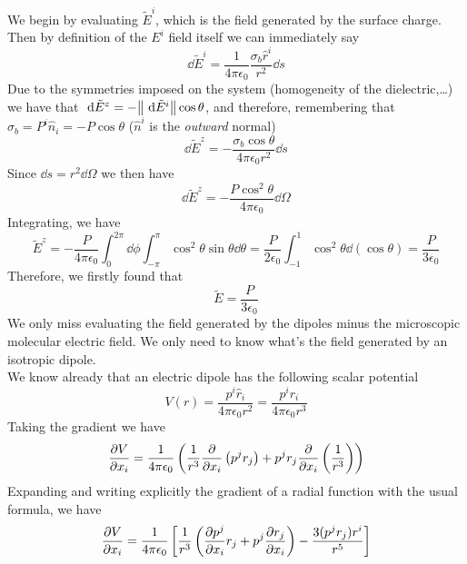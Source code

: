 \documentclass[../electromagnetism]{subfiles}
\begin{document}
We begin by evaluating $\tilde{E}^i$, which is the field generated by the surface charge. Then by definition of the $E^i$ field itself we can immediately say
\begin{equation*}
	\dd\tilde{E}^i=\frac{1}{4\pi\epsilon_0}\frac{\sigma_b\hat{r}^i}{r^2}\dd s
\end{equation*}
Due to the symmetries imposed on the system (homogeneity of the dielectric,\ldots) we have that $\ \mathrm{d}\tilde{E}^z=-\norm{\ \mathrm{d}\tilde{E}^i}\cos\theta$, and therefore, remembering that $\sigma_b=P^i\hat{n}_i=-P\cos\theta$ ($\hat{n}^i$ is the \emph{outward} normal)
\begin{equation*}
	\dd\tilde{E}^z=-\frac{\sigma_b\cos\theta}{4\pi\epsilon_0r^2}\dd s
\end{equation*}
Since $\dd s=r^2\dd\Omega$ we then have
\begin{equation}
	\dd\tilde{E}^z=-\frac{P\cos^2\theta}{4\pi\epsilon_0}\dd\Omega
	\label{eq:tildeez}
\end{equation}
Integrating, we have
\begin{equation}
	\tilde{E}^z=-\frac{P}{4\pi\epsilon_0}\int_{0}^{2\pi}\dd\phi\int_{-\pi}^{\pi}\cos^2\theta\sin\theta\dd\theta=\frac{P}{2\epsilon_0}\int_{-1}^1\cos^2\theta\dd\left( \cos\theta \right)=\frac{P}{3\epsilon_0}
	\label{eq:tildeezintdie}
\end{equation}
Therefore, we firstly found that
\begin{equation}
	\tilde{E}=\frac{P}{3\epsilon_0}
	\label{eq:pover3epsilonnottildee}
\end{equation}
We only miss evaluating the field generated by the dipoles minus the microscopic molecular electric field. We only need to know what's the field generated by an isotropic dipole.\\
We know already that an electric dipole has the following scalar potential
\begin{equation*}
	V(r)=\frac{p^i\hat{r}_i}{4\pi\epsilon_0r^2}=\frac{p^ir_i}{4\pi\epsilon_0r^3}
\end{equation*}
Taking the gradient we have
\begin{equation*}
	\pdv{V}{x_i}=\frac{1}{4\pi\epsilon_0}\left( \frac{1}{r^3}\pdv{x_i}\left( p^jr_j \right)+p^jr_j\pdv{x_i}\left( \frac{1}{r^3} \right) \right)
\end{equation*}
Expanding and writing explicitly the gradient of a radial function with the usual formula, we have
\begin{equation*}
	\pdv{V}{x_i}=\frac{1}{4\pi\epsilon_0}\left[ \frac{1}{r^3}\left( \pdv{p^j}{x_i}r_j+p^j\pdv{r_j}{x_i} \right)-\frac{3(p^jr_j)r^i}{r^5} \right]
\end{equation*}
\end{document}
